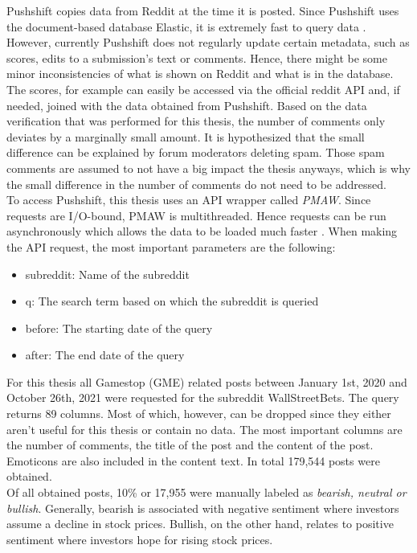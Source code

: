 \documentclass[11pt, a4paper]{article}
\begin{document}
Pushshift copies data from Reddit at the time it is posted. Since Pushshift uses the document-based database Elastic, it is extremely fast to query data \citep{elastic2015}. However, currently Pushshift does not regularly update certain metadata, such as scores, edits to a submission’s text or comments. Hence, there might be some minor inconsistencies of what is shown on Reddit and what is in the database. The scores, for example can easily be accessed via the official reddit API and, if needed, joined with the data obtained from Pushshift. Based on the data verification that was performed for this thesis, the number of comments only deviates by a marginally small amount. It is hypothesized that the small difference can be explained by forum moderators deleting spam. Those spam comments are assumed to not have a big impact the thesis anyways, which is why the small difference in the number of comments do not need to be addressed. \\
To access Pushshift, this thesis uses an API wrapper called \emph{PMAW}. Since requests are I/O-bound, PMAW is multithreaded. Hence requests can be run asynchronously which allows the data to be loaded much faster \citep{pmaw2021}.
When making the API request, the most important parameters are the following:
\begin{itemize}
    \item subreddit: Name of the subreddit
    \item q: The search term based on which the subreddit is queried
    \item before: The starting date of the query
    \item after: The end date of the query
\end{itemize}

For this thesis all Gamestop (GME) related posts between January 1st, 2020 and October 26th, 2021 were requested for the subreddit WallStreetBets. 
The query returns 89 columns. Most of which, however, can be dropped since they either aren’t useful for this thesis or contain no data. 
The most important columns are the number of comments, the title of the post and the content of the post. 
Emoticons are also included in the content text. In total 179,544 posts were obtained.\\
Of all obtained posts, 10\% or 17,955 were manually labeled as \emph{bearish, neutral or bullish}. Generally, bearish is associated with negative 
sentiment where investors assume a decline in stock prices. Bullish, on the other hand, relates to positive sentiment where investors hope for rising stock prices.
\end{document}
